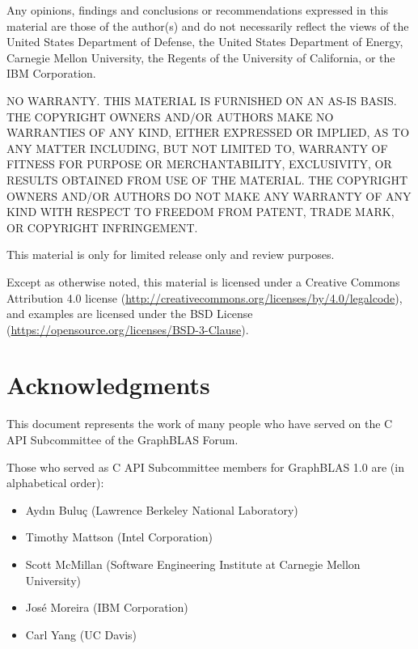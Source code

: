 \documentclass[11pt]{extarticle}
\begin{document}
Any opinions, findings and conclusions or recommendations expressed in this material are those of the author(s) and do not necessarily reflect the views of the United States Department of Defense, the United States Department of Energy, Carnegie Mellon University, the Regents of the University of California, or the IBM Corporation.  

NO WARRANTY. THIS MATERIAL IS FURNISHED ON AN AS-IS BASIS. THE COPYRIGHT OWNERS AND/OR AUTHORS MAKE NO WARRANTIES OF ANY KIND, EITHER EXPRESSED OR IMPLIED, AS TO ANY MATTER INCLUDING, BUT NOT LIMITED TO, WARRANTY OF FITNESS FOR PURPOSE OR MERCHANTABILITY, EXCLUSIVITY, OR RESULTS OBTAINED FROM USE OF THE MATERIAL. THE COPYRIGHT OWNERS AND/OR AUTHORS DO NOT MAKE ANY WARRANTY OF ANY KIND WITH RESPECT TO FREEDOM FROM PATENT, TRADE MARK, OR COPYRIGHT INFRINGEMENT.

This material is only for limited release only and review purposes.


Except as otherwise noted, this material is licensed under a Creative Commons Attribution 4.0 license (\href{http://creativecommons.org/licenses/by/4.0/legalcode}{http://creativecommons.org/licenses/by/4.0/legalcode}), and examples are licensed under the BSD License (\href{https://opensource.org/licenses/BSD-3-Clause}{https://opensource.org/licenses/BSD-3-Clause}).


\pagebreak
\tableofcontents
\pagebreak


\section*{Acknowledgments}


This document represents the work of many people who have served on the C API
Subcommittee of the GraphBLAS Forum.

Those who served as C API Subcommittee members for GraphBLAS 1.0 are (in alphabetical order):
\begin{itemize}
\item Ayd\i n Bulu\c{c} (Lawrence Berkeley National Laboratory)
\item Timothy Mattson (Intel Corporation)
\item Scott McMillan (Software Engineering Institute at Carnegie Mellon University)
\item Jos\'e Moreira (IBM Corporation)
\item Carl Yang (UC Davis)
\end{itemize}
\end{document}
